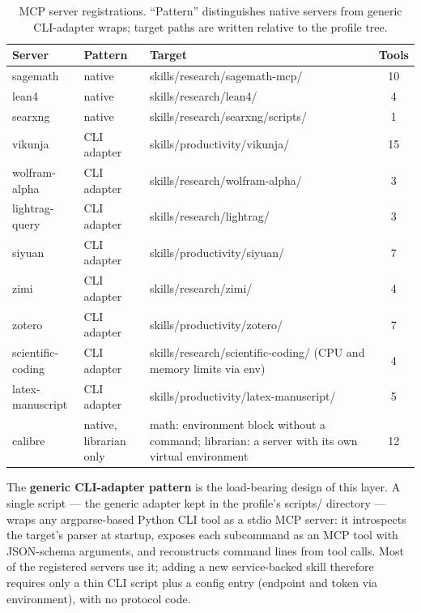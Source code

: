 \documentclass[10pt]{article}
\newcommand{\mono}[1]{{\ttfamily\small #1}}
\begin{document}
\begin{table}[H]
\centering\small
\caption{MCP server registrations. ``Pattern'' distinguishes native servers from generic
CLI-adapter wraps; target paths are written relative to the profile tree.}
\label{tab:mcp}
\renewcommand{\arraystretch}{1.2}
\begin{tabularx}{\textwidth}{@{}l l X c@{}}
\toprule
\textbf{Server} & \textbf{Pattern} & \textbf{Target} & \textbf{Tools} \\
\midrule
sagemath & native & \mono{skills/research/sagemath-mcp/} & 10 \\
lean4 & native & \mono{skills/research/lean4/} & 4 \\
searxng & native & \mono{skills/research/searxng/scripts/} & 1 \\
vikunja & CLI adapter & \mono{skills/productivity/vikunja/} & 15 \\
wolfram-alpha & CLI adapter & \mono{skills/research/wolfram-alpha/} & 3 \\
lightrag-query & CLI adapter & \mono{skills/research/lightrag/} & 3 \\
siyuan & CLI adapter & \mono{skills/productivity/siyuan/} & 7 \\
zimi & CLI adapter & \mono{skills/research/zimi/} & 4 \\
zotero & CLI adapter & \mono{skills/productivity/zotero/} & 7 \\
scientific-coding & CLI adapter & \mono{skills/research/scientific-coding/} (CPU and memory limits via env) & 4 \\
latex-manuscript & CLI adapter & \mono{skills/productivity/latex-manuscript/} & 5 \\
calibre & native, librarian only & math: environment block without a command; librarian: a server with its own virtual environment & 12 \\
\bottomrule
\end{tabularx}
\end{table}

The \textbf{generic CLI-adapter pattern} is the load-bearing design of this layer. A single script ---
the generic adapter kept in the profile's \mono{scripts/} directory --- wraps any argparse-based Python CLI tool as a
stdio MCP server: it introspects the target's parser at startup, exposes each subcommand as an MCP
tool with JSON-schema arguments, and reconstructs command lines from tool calls. Most of the
registered servers use it; adding a new service-backed skill therefore requires only a thin CLI
script plus a config entry (endpoint and token via environment), with no protocol code.
\end{document}
